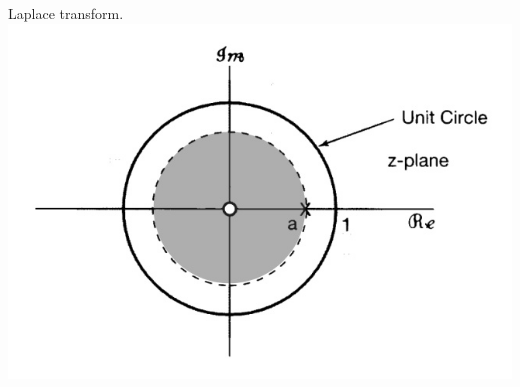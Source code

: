 \documentclass{article}
\begin{document}
Laplace transform.\\
\includegraphics[scale=0.2]{z-roc.jpg}

\pagebreak
\end{document}
